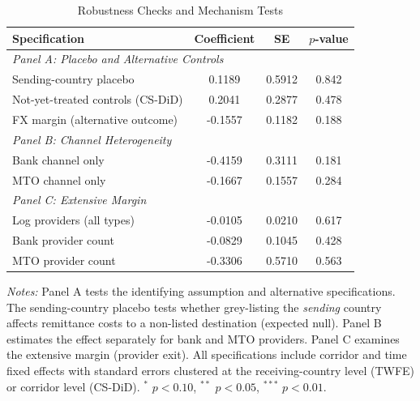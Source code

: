 \begin{table}[H]
\centering
\caption{Robustness Checks and Mechanism Tests}
\label{tab:robust}
\begin{threeparttable}
\begin{tabular}{l ccc}
\toprule
Specification & Coefficient & SE & $p$-value \\
\midrule
\multicolumn{4}{l}{\textit{Panel A: Placebo and Alternative Controls}} \\
Sending-country placebo & 0.1189 & 0.5912 & 0.842 \\
Not-yet-treated controls (CS-DiD) & 0.2041 & 0.2877 & 0.478 \\
FX margin (alternative outcome) & -0.1557 & 0.1182 & 0.188 \\
\midrule
\multicolumn{4}{l}{\textit{Panel B: Channel Heterogeneity}} \\
Bank channel only & -0.4159 & 0.3111 & 0.181 \\
MTO channel only & -0.1667 & 0.1557 & 0.284 \\
\midrule
\multicolumn{4}{l}{\textit{Panel C: Extensive Margin}} \\
Log providers (all types) & -0.0105 & 0.0210 & 0.617 \\
Bank provider count & -0.0829 & 0.1045 & 0.428 \\
MTO provider count & -0.3306 & 0.5710 & 0.563 \\
\bottomrule
\end{tabular}
\begin{tablenotes}[flushleft]
\small
\item \textit{Notes:} Panel A tests the identifying assumption and alternative specifications. The sending-country placebo tests whether grey-listing the \textit{sending} country affects remittance costs to a non-listed destination (expected null). Panel B estimates the effect separately for bank and MTO providers. Panel C examines the extensive margin (provider exit). All specifications include corridor and time fixed effects with standard errors clustered at the receiving-country level (TWFE) or corridor level (CS-DiD). $^{*}$ $p<0.10$, $^{**}$ $p<0.05$, $^{***}$ $p<0.01$.
\end{tablenotes}
\end{threeparttable}
\end{table}
